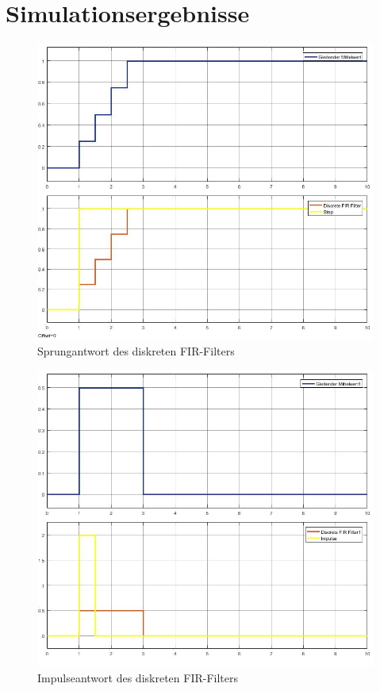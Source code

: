 \documentclass[12pt,a4paper]{report}
\begin{document}
\section{Simulationsergebnisse}
\begin{figure}[ht]
	\centering
	\includegraphics[width=0.9\linewidth]{marius/FIR_Step}
	\caption{Sprungantwort des diskreten FIR-Filters}
	\label{fig:FIR_Step}
\end{figure}
\begin{figure}[ht]
	\centering
	\includegraphics[width=0.9\linewidth]{marius/FIR_Impulse}
	\caption{Impulseantwort des diskreten FIR-Filters}
	\label{fig:FIR_Impulse}
\end{figure}
\end{document}
